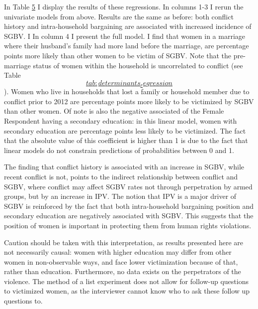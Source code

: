 \documentclass[
]{article}
\begin{document}
In Table \hyperref[tab:results_regression]{5} I display the results of
these regressions. In columns 1-3 I rerun the univariate models from
above. Results are the same as before: both conflict history and
intra-household bargaining are associated with increased incidence of
SGBV. I In column 4 I present the full model. I find that women in a
marriage where their husband's family had more land before the marriage,
are percentage points more likely than other women to be victim of SGBV.
Note that the pre-marriage status of women within the household is
uncorrelated to conflict (see Table
\hyperref[tab:determinants_regression]{\[tab:determinants_regression\]}).
Women who live in households that lost a family or household member due
to conflict prior to 2012 are percentage points more likely to be
victimized by SGBV than other women. Of note is also the negative
associated of the Female Respondent having a secondary education: in
this linear model, women with secondary education are percentage points
less likely to be victimized. The fact that the absolute value of this
coefficient is higher than 1 is due to the fact that linear models do
not constrain predictions of probabilities between 0 and 1.

The finding that conflict history is associated with an increase in
SGBV, while recent conflict is not, points to the indirect relationship
between conflict and SGBV, where conflict may affect SGBV rates not
through perpetration by armed groups, but by an increase in IPV. The
notion that IPV is a major driver of SGBV is reinforced by the fact that
both intra-household bargaining position and secondary education are
negatively associated with SGBV. This suggests that the position of
women is important in protecting them from human rights violations.

Caution should be taken with this interpretation, as results presented
here are not necessarily causal: women with higher education may differ
from other women in non-observable ways, and face lower victimization
because of that, rather than education. Furthermore, no data exists on
the perpetrators of the violence. The method of a list experiment does
not allow for follow-up questions to victimized women, as the
interviewer cannot know who to ask these follow up questions to.
\end{document}
